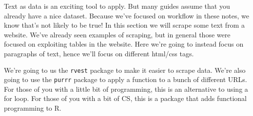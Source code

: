 \documentclass[
]{book}
\newenvironment{Shaded}{\begin{snugshade}}{\end{snugshade}}
\newcommand{\CommentTok}[1]{\textcolor[rgb]{0.56,0.35,0.01}{\textit{#1}}}
\newcommand{\KeywordTok}[1]{\textcolor[rgb]{0.13,0.29,0.53}{\textbf{#1}}}
\newcommand{\NormalTok}[1]{#1}
\newcommand{\OperatorTok}[1]{\textcolor[rgb]{0.81,0.36,0.00}{\textbf{#1}}}
\newcommand{\StringTok}[1]{\textcolor[rgb]{0.31,0.60,0.02}{#1}}
\begin{document}
Text as data is an exciting tool to apply. But many guides assume that you already have a nice dataset. Because we've focused on workflow in these notes, we know that's not likely to be true! In this section we will scrape some text from a website. We've already seen examples of scraping, but in general those were focused on exploiting tables in the website. Here we're going to instead focus on paragraphs of text, hence we'll focus on different html/css tags.

We're going to us the \texttt{rvest} package to make it easier to scrape data. We're also going to use the \texttt{purrr} package to apply a function to a bunch of different URLs. For those of you with a little bit of programming, this is an alternative to using a for loop. For those of you with a bit of CS, this is a package that adds functional programming to R.

\begin{Shaded}
\end{Shaded}
\end{document}
